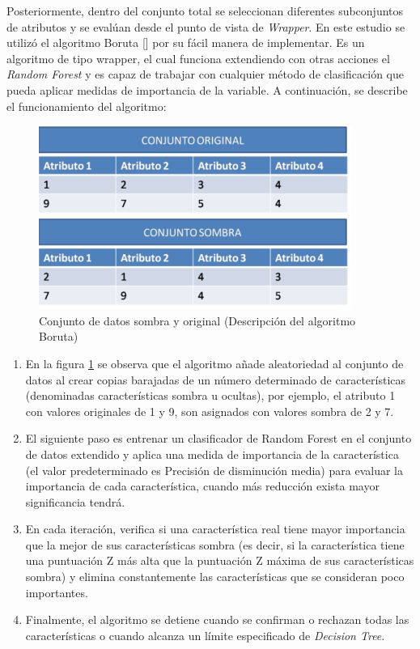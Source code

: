 \begin{enumerate}
    Posteriormente, dentro del conjunto total se seleccionan diferentes subconjuntos de atributos y se evalúan desde el punto de vista de \textit{Wrapper}.
    En este estudio se utilizó el algoritmo Boruta [\cite{andreaperlato}] por su fácil manera de implementar. Es un algoritmo de tipo wrapper, el cual funciona extendiendo con otras acciones el \textit{Random Forest} y es capaz de trabajar con cualquier método de clasificación que pueda aplicar medidas de importancia de la variable. A continuación, se describe el funcionamiento del algoritmo:

    \begin{figure}[htb]
        \centering
        \includegraphics[width = 1 \textwidth]{Graphics/Pasted image 20240101133925.png}
        \caption{Conjunto de datos sombra y original (Descripción del algoritmo Boruta)}
        \label{Boruta1}
    \end{figure}

    \begin{enumerate}
        \item En la figura \ref{Boruta1} se observa que el algoritmo añade aleatoriedad al conjunto de datos al crear copias barajadas de un número determinado de características (denominadas características sombra u ocultas), por ejemplo, el atributo 1 con valores originales de 1 y 9, son asignados con valores sombra de 2 y 7. 
        \item El siguiente paso es entrenar un clasificador de Random Forest en el conjunto de datos extendido y aplica una medida de importancia de la característica (el valor predeterminado es Precisión de disminución media) para evaluar la importancia de cada característica, cuando más reducción exista mayor significancia tendrá. 
        \item En cada iteración, verifica si una característica real tiene mayor importancia que la mejor de sus características sombra (es decir, si la característica tiene una puntuación Z más alta que la puntuación Z máxima de sus características sombra) y elimina constantemente las características que se consideran poco importantes. 
        \item Finalmente, el algoritmo se detiene cuando se confirman o rechazan todas las características o cuando alcanza un límite especificado de \textit{Decision Tree}.
    \end{enumerate}
\end{enumerate}

